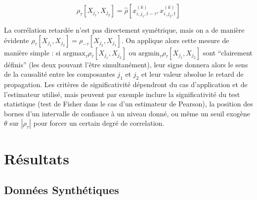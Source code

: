 \documentclass[english]{./sageo}
\begin{document}
\begin{equation}
\rho_{\tau}\left[X_{j_1},X_{j_2}\right] = \hat{\rho}\left[x^{(k)}_{i,j_1,t - \tau},x^{(k)}_{i,j_2,t}\right]
\end{equation}

La corrélation retardée n'est pas directement symétrique, mais on a de manière évidente $\rho_{\tau}\left[X_{j_1},X_{j_2}\right] = \rho_{-\tau}\left[X_{j_2},X_{j_1}\right]$. On applique alors cette mesure de manière simple : si $\textrm{argmax}_{\tau} \rho_{\tau}\left[X_{j_1},X_{j_2}\right]$ ou $\textrm{argmin}_{\tau} \rho_{\tau}\left[X_{j_1},X_{j_2}\right]$ sont ``clairement définis'' (les deux pouvant l'être simultanément), leur signe donnera alors le sens de la causalité entre les composantes $j_1$ et $j_2$ et leur valeur absolue le retard de propagation. Les critères de significativité dépendront du cas d'application et de l'estimateur utilisé, mais peuvent par exemple inclure la significativité du test statistique (test de Fisher dans le cas d'un estimateur de Pearson), la position des bornes d'un intervalle de confiance à un niveau donné, ou même un seuil exogène $\theta$ sur $\left|\rho_{\tau}\right|$ pour forcer un certain degré de correlation. 










\section{Résultats}


\subsection{Données Synthétiques}
\end{document}
